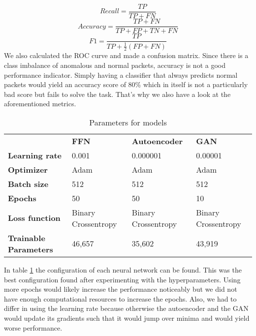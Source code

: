 \documentclass[]{article}
\begin{document}
	\begin{equation}
		Recall = \frac{TP}{TP + FN}
	\end{equation}
	\begin{equation}
		Accuracy = \frac{TP + FN}{TP+FP+TN+FN}
	\end{equation}
\begin{equation}
	F1 = \frac{TP}{TP + \frac{1}{2} (FP+FN)}
\end{equation}
	We also calculated the ROC curve and made a confusion matrix. Since there is a class imbalance of anomalous and normal packets, accuracy is not a good performance indicator. Simply having a classifier that always predicts normal packets would yield an accuracy score of 80\% which in itself is not a particularly bad score but fails to solve the task. That's why we also have a look at the aforementioned metrics. 
	\newline
	
	\begin{table}[]
		\begin{tabular}{llll}
			& \textbf{FFN}        & \textbf{Autoencoder} & \textbf{GAN}        \\
			\textbf{Learning rate} & 0.001               & 0.000001             & 0.00001             \\
			\textbf{Optimizer}     & Adam                & Adam                 & Adam                \\
			\textbf{Batch size}    & 512                 & 512                  & 512                 \\
			\textbf{Epochs}        & 50                  & 50                   & 10                  \\
			\textbf{Loss function} & Binary Crossentropy & Binary Crossentropy  & Binary Crossentropy \\
			\textbf{Trainable Parameters} & 46,657 &  35,602 & 43,919 \\
		\end{tabular}
		\caption{Parameters for models}
		\label{para}
	\end{table}

	\noindent
	In table \ref{para} the configuration of each neural network can be found. This was the best configuration found after experimenting with the hyperparameters. Using more epochs would likely increase the performance noticeably but we did not have enough computational resources to increase the epochs. Also, we had to differ in using the learning rate because otherwise the autoencoder and the GAN would update its gradients such that it would jump over minima and would yield worse performance. 
	
\end{document}
